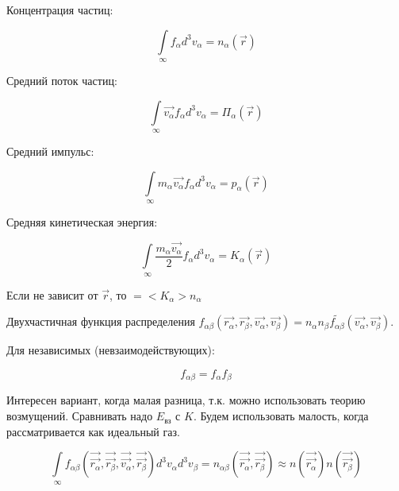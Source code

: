 \documentclass[10pt, a4paper]{article}
\numberwithin{equation}{section}
\begin{document}
Концентрация частиц:

\begin{equation*}
	\int\limits_{\infty}f_\alpha d^3v_\alpha = n_\alpha(\vec{r})
\end{equation*}

Средний поток частиц:

\begin{equation*}
	\int\limits_{\infty}\overrightarrow{v_\alpha}f_\alpha d^3v_\alpha = \Pi_\alpha(\vec{r})
\end{equation*}

Средний импульс:

\begin{equation*}
	\int\limits_{\infty}m_\alpha\overrightarrow{v_\alpha}f_\alpha d^3v_\alpha = p_\alpha(\vec{r})
\end{equation*}

Средняя кинетическая энергия:

\begin{equation*}
	\int\limits_{\infty}\frac{m_\alpha\overrightarrow{v_\alpha}}{2}f_\alpha d^3v_\alpha = K_\alpha(\vec{r})
\end{equation*}

Если не зависит от $\vec{r}$, то $=<K_\alpha>n_\alpha$

Двухчастичная функция распределения $f_{\alpha\beta}(\overrightarrow{r_\alpha}, \overrightarrow{r_\beta}, \overrightarrow{v_\alpha}, \overrightarrow{v_\beta}) = n_\alpha n_\beta \widetilde{f_{\alpha\beta}}(\overrightarrow{v_\alpha}, \overrightarrow{v_\beta})$.

Для независимых (невзаимодействующих):

\begin{equation*}
	f_{\alpha\beta} = f_\alpha f_\beta
\end{equation*}
	
Интересен вариант, когда малая разница, т.к. можно использовать теорию возмущений. Сравнивать надо $E_\text{вз}$ с $K$. Будем использовать малость, когда рассматривается как идеальный газ.

\begin{equation*}
	\int\limits_{\infty}f_{\alpha\beta}(\vec{\overrightarrow{r_\alpha}}, \vec{\overrightarrow{r_\beta}}, \vec{\overrightarrow{v_\alpha}}, \vec{\overrightarrow{r_\beta}})d^3v_\alpha d^3v_\beta = n_{\alpha\beta}(\vec{\overrightarrow{r_\alpha}}, \vec{\overrightarrow{r_\beta}}) \approx n(\vec{\overrightarrow{r_\alpha}}) n(\vec{\overrightarrow{r_\beta}})
\end{equation*}
	
\end{document}
